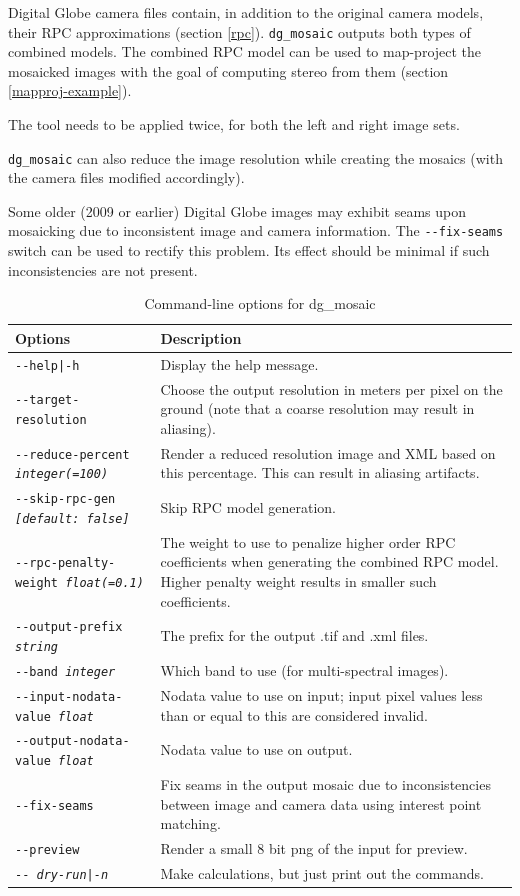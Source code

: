 Digital Globe camera files contain, in addition to the original camera
models, their RPC approximations (section
\ref{rpc}). \texttt{dg\_mosaic} outputs both types of combined
models. The combined RPC model can be used to map-project the mosaicked
images with the goal of computing stereo from them (section
\ref{mapproj-example}).

The tool needs to be applied twice, for both the left and right image sets.

\texttt{dg\_mosaic} can also reduce the image resolution while creating the
mosaics (with the camera files modified accordingly).

Some older (2009 or earlier) Digital Globe images may exhibit seams upon mosaicking
due to inconsistent image and camera information. The \texttt{-\/-fix-seams} switch
can be used to rectify this problem. Its effect should be minimal if such inconsistencies
are not present.

\begin{longtable}{|l|p{10cm}|}
\caption{Command-line options for dg\_mosaic}
\label{tbl:dgmosaic}
\endfirsthead
\endhead
\endfoot
\endlastfoot
\hline
Options & Description \\ \hline \hline
\texttt{-\/-help|-h} & Display the help message.\\ \hline
\texttt{-\/-target-resolution} &
Choose the output resolution in meters per pixel on the ground (note that a coarse resolution may result in aliasing). \\ \hline
\texttt{-\/-reduce-percent \textit{integer(=100)}} &
Render a reduced resolution image and XML based on this percentage. This can result in aliasing artifacts. \\ \hline
\texttt{-\/-skip-rpc-gen \textit{[default: false]}} &
Skip RPC model generation.\\ \hline
\texttt{-\/-rpc-penalty-weight \textit{float(=0.1)}} &
The weight to use to penalize higher order RPC coefficients when generating the combined RPC model. Higher penalty weight results in smaller such coefficients.\\ \hline
\texttt{-\/-output-prefix \textit{string}} & The prefix for the output .tif and .xml files. \\ \hline
\texttt{-\/-band \textit{integer}} & Which band to use (for multi-spectral images). \\ \hline
\texttt{-\/-input-nodata-value \textit{float}} & Nodata value to use on input; input pixel values less than or equal to this are considered invalid. \\ \hline
\texttt{-\/-output-nodata-value \textit{float}} & Nodata value to use on output. \\ \hline

\texttt{-\/-fix-seams} & Fix seams in the output mosaic due to inconsistencies between image and camera data using interest point matching. \\ \hline

\texttt{-\/-preview } & Render a small 8 bit png of the input for preview. \\ \hline
\texttt{-\/- \textit{dry-run|-n}} & Make calculations, but just print out the commands. \\ \hline
\end{longtable}

